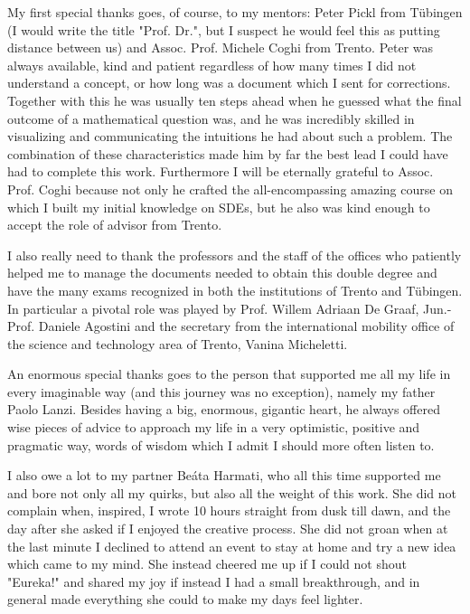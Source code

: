My first special thanks goes, of course, to my mentors: Peter Pickl from Tübingen (I would write the title "Prof. Dr.", but I suspect he would feel this as putting distance between us) and Assoc. Prof. Michele Coghi from Trento.
Peter was always available, kind and patient regardless of how many times I did not understand a concept, or how long was a document which I sent for corrections.
Together with this he was usually ten steps ahead when he guessed what the final outcome of a mathematical question was, and he was incredibly skilled in visualizing and communicating the intuitions he had about such a problem.
The combination of these characteristics made him by far the best lead I could have had to complete this work.
Furthermore I will be eternally grateful to Assoc. Prof. Coghi because not only he crafted the all-encompassing amazing course on which I built my initial knowledge on SDEs, but he also was kind enough to accept the role of advisor from Trento.

I also really need to thank the professors and the staff of the offices who patiently helped me to manage the documents needed to obtain this double degree and have the many exams recognized in both the institutions of Trento and Tübingen.
In particular a pivotal role was played by Prof. Willem Adriaan De Graaf, Jun.-Prof. Daniele Agostini and the secretary from the international mobility office of the science and technology area of Trento, Vanina Micheletti.

An enormous special thanks goes to the person that supported me all my life in every imaginable way (and this journey was no exception), namely my father Paolo Lanzi.
Besides having a big, enormous, gigantic heart, he always offered wise pieces of advice to approach my life in a very optimistic, positive and pragmatic way, words of wisdom which I admit I should more often listen to.

I also owe a lot to my partner Beáta Harmati, who all this time supported me and bore not only all my quirks, but also all the weight of this work.
She did not complain when, inspired, I wrote 10 hours straight from dusk till dawn, and the day after she asked if I enjoyed the creative process.
She did not groan when at the last minute I declined to attend an event to stay at home and try a new idea which came to my mind. 
She instead cheered me up if I could not shout "Eureka!" and shared my joy if instead I had a small breakthrough, and in general made everything she could to make my days feel lighter.

